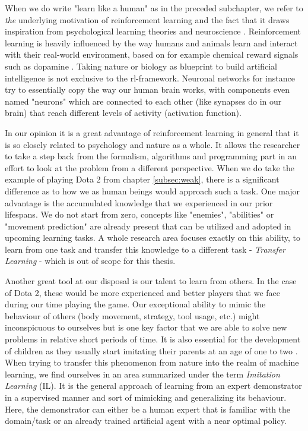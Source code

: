 When we do write "learn like a human" as in the preceded subchapter, we refer to \textit{the} underlying motivation of reinforcement learning and the fact that it draws inspiration from psychological learning theories \cite[p.~341]{Sutton1998} and neuroscience \cite[p.~377]{Sutton1998}. Reinforcement learning is heavily influenced by the way humans and animals learn and interact with their real-world environment, based on for example chemical reward signals such as dopamine \cite[p.~383]{Sutton1998}. Taking nature or biology as blueprint to build artificial intelligence is not exclusive to the rl-framework. Neuronal networks for instance try to essentially copy the way our human brain works, with components even named "neurons" which are connected to each other (like synapses do in our brain) that reach different levels of activity (activation function).
\par
In our opinion it is a great advantage of reinforcement learning in general that it is so closely related to psychology and nature as a whole. It allows the researcher to take a step back from the formalism, algorithms and programming part in an effort to look at the problem from a different perspective. When we do take the example of playing Dota 2 from chapter \ref{subsec:weak}, there is a significant difference as to how we as human beings would approach such a task. One major advantage is the accumulated knowledge that we experienced in our prior lifespans. We do not start from zero, concepts like "enemies", "abilities" or "movement prediction" are already present that can be utilized and adopted in upcoming learning tasks. A whole research area focuses exactly on this ability, to learn from one task and transfer this knowledge to a different task - \textit{Transfer Learning} - which is out of scope for this thesis.
\par
Another great tool at our disposal is our talent to learn from others. In the case of Dota 2, these would be more experienced and better players that we face during our time playing the game. Our exceptional ability to mimic the behaviour of others (body movement, strategy, tool usage, etc.) might inconspicuous to ourselves but is one key factor that we are able to solve new problems in relative short periods of time. It is also essential for the development of children as they usually start imitating their parents at an age of one to two \cite[p.347]{wood2013whom}. When trying to transfer this phenomenon from nature into the realm of machine learning, we find ourselves in an area summarized under the term \textit{Imitation Learning} (IL). It is the general approach of learning from an expert demonstrator in a supervised manner and sort of mimicking and generalizing its behaviour. Here, the demonstrator can either be a human expert that is familiar with the domain/task or an already trained artificial agent with a near optimal policy.
